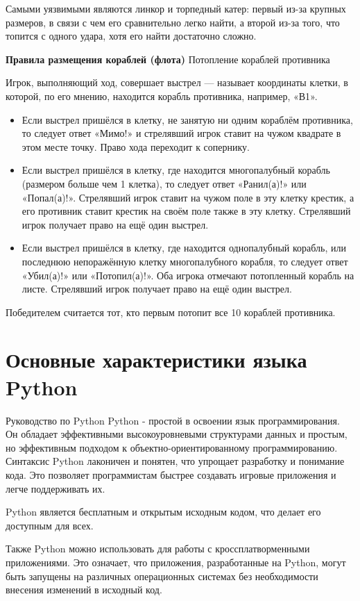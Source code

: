Самыми уязвимыми являются линкор и торпедный катер: первый из-за крупных размеров, в связи с чем его сравнительно легко найти, а второй из-за того, что топится с одного удара, хотя его найти достаточно сложно.

\textbf{Правила размещения кораблей (флота)} Потопление кораблей противника

Игрок, выполняющий ход, совершает выстрел — называет координаты клетки, в которой, по его мнению, находится корабль противника, например, «В1».
\begin{itemize}
\item Если выстрел пришёлся в клетку, не занятую ни одним кораблём противника, то следует ответ «Мимо!» и стрелявший игрок ставит на чужом квадрате в этом месте точку. Право хода переходит к сопернику.
\item Если выстрел пришёлся в клетку, где находится многопалубный корабль (размером больше чем 1 клетка), то следует ответ «Ранил(а)!» или «Попал(а)!». Стрелявший игрок ставит на чужом поле в эту клетку крестик, а его противник ставит крестик на своём поле также в эту клетку. Стрелявший игрок получает право на ещё один выстрел.
\item Если выстрел пришёлся в клетку, где находится однопалубный корабль, или последнюю непоражённую клетку многопалубного корабля, то следует ответ «Убил(а)!» или «Потопил(а)!». Оба игрока отмечают потопленный корабль на листе. Стрелявший игрок получает право на ещё один выстрел.
\end{itemize}
Победителем считается тот, кто первым потопит все 10 кораблей противника.

\section{\label{sec:ch01/sec02}Основные характеристики языка Python}

Руководство по Python
Python - простой в освоении язык программирования. Он обладает эффективными высокоуровневыми структурами данных и простым, но эффективным подходом к объектно-ориентированному программированию. Синтаксис Python лаконичен и понятен, что упрощает разработку и понимание кода. Это позволяет программистам быстрее создавать игровые приложения и легче поддерживать их.

Python является бесплатным и открытым исходным кодом, что делает его доступным для всех. 

Также Python можно использовать для работы с кроссплатворменными приложениями. Это означает, что приложения, разработанные на Python, могут быть запущены на различных операционных системах без необходимости внесения изменений в исходный код.

